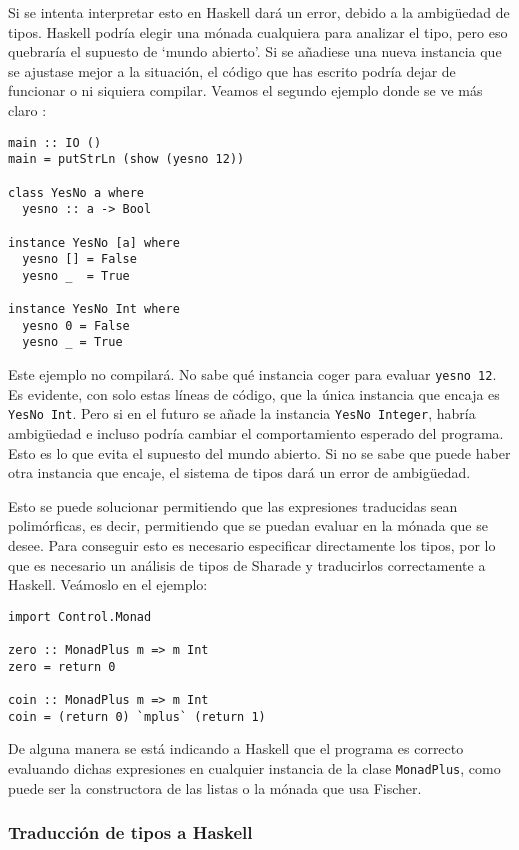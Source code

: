 \documentclass[class=article, crop=false]{standalone}
\begin{document}
Si se intenta interpretar esto en Haskell dará un error, debido a la ambigüedad de tipos.
Haskell podría elegir una mónada cualquiera para analizar el tipo, pero eso quebraría el
supuesto de `mundo abierto'. Si se añadiese una nueva instancia que se ajustase mejor a la
situación, el código que has escrito podría dejar de funcionar o ni siquiera compilar. Veamos
el segundo ejemplo donde se ve más claro \cite{Lipovaca:2011:LYH:2018642}:

\begin{verbatim}
main :: IO ()
main = putStrLn (show (yesno 12))

class YesNo a where
  yesno :: a -> Bool
  
instance YesNo [a] where
  yesno [] = False
  yesno _  = True

instance YesNo Int where
  yesno 0 = False
  yesno _ = True
\end{verbatim}

Este ejemplo no compilará. No sabe qué instancia coger para evaluar \verb`yesno 12`. Es
evidente, con solo estas líneas de código, que la única instancia que encaja es
\verb`YesNo Int`. Pero si en el futuro se añade la instancia \verb`YesNo Integer`, habría
ambigüedad e incluso podría cambiar el comportamiento esperado del programa. Esto es lo que
evita el supuesto del mundo abierto. Si no se sabe que puede haber otra instancia que encaje,
el sistema de tipos dará un error de ambigüedad.

Esto se puede solucionar permitiendo que las expresiones traducidas sean polimórficas, es
decir, permitiendo que se puedan evaluar en la mónada que se desee. Para conseguir esto es
necesario especificar directamente los tipos, por lo que es necesario un análisis de tipos de
Sharade y traducirlos correctamente a Haskell. Veámoslo en el ejemplo:

\begin{verbatim}
import Control.Monad

zero :: MonadPlus m => m Int
zero = return 0

coin :: MonadPlus m => m Int
coin = (return 0) `mplus` (return 1)
\end{verbatim}

De alguna manera se está indicando a Haskell que el programa es correcto evaluando dichas
expresiones en cualquier instancia de la clase \verb`MonadPlus`, como puede ser la
constructora de las listas o la mónada que usa Fischer.

\subsubsection{Traducción de tipos a Haskell}
\end{document}
